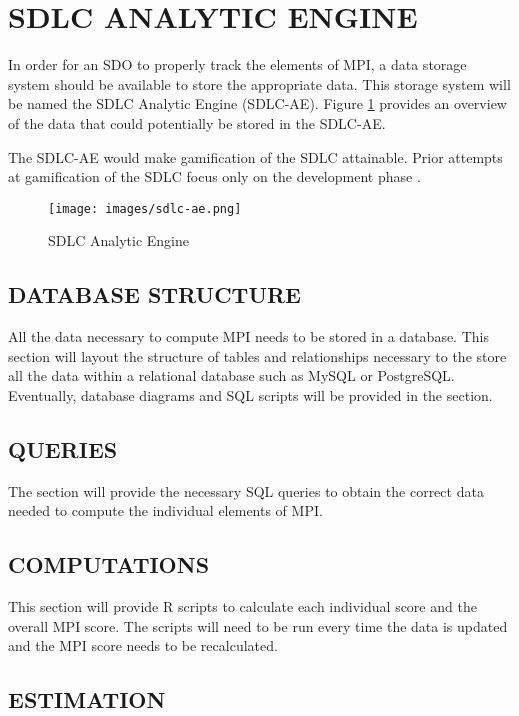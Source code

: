 \documentclass[SDSUThesis.tex]{subfiles}
\begin{document}
\section{SDLC ANALYTIC ENGINE}

In order for an SDO to properly track the elements of MPI, a data storage system should be available to store the appropriate data.   This storage system will be named the SDLC Analytic Engine (SDLC-AE). Figure \ref{fig:sdlc-ae} provides an overview of the data that could potentially be stored in the SDLC-AE.

The SDLC-AE would make gamification of the SDLC attainable.  Prior attempts
at gamification of the SDLC focus only on the development phase \cite{Dubois2013} \cite{Snipes2013}.

\begin{figure}[ht]
\texttt{[image: images/sdlc-ae.png]}
\caption{SDLC Analytic Engine}
\label{fig:sdlc-ae}
\end{figure}

\subsection{DATABASE STRUCTURE}
   All the data necessary to compute MPI needs to be stored in a database.  This section will 
   layout the structure of tables and relationships necessary to the store all the data
   within a relational database such as MySQL or PostgreSQL.  Eventually,
   database diagrams and SQL scripts will be provided in the section.

\subsection{QUERIES}
    The section will provide the necessary SQL queries to obtain the correct data
    needed to compute the individual elements of MPI.
    
\subsection{COMPUTATIONS}
    This section will provide R scripts to calculate each individual score and the overall 
    MPI score. The scripts will need to be run every time the data is updated and the MPI
    score needs to be recalculated.


    \subsection{ESTIMATION}
    
\end{document}
